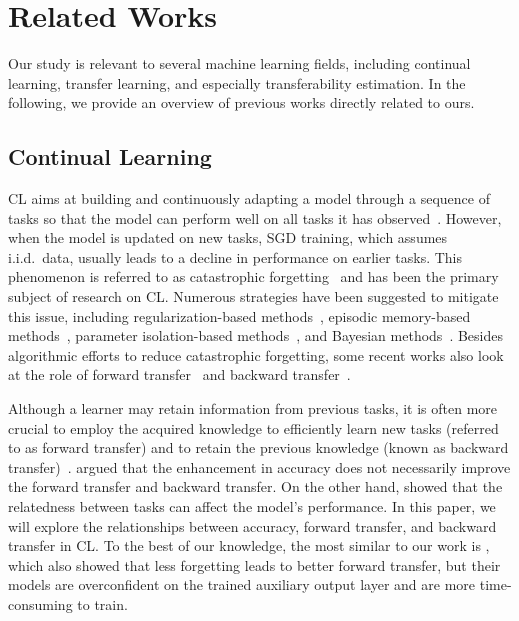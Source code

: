 \section{Related Works}
Our study is relevant to several machine learning fields, including continual learning, transfer learning, and especially transferability estimation. In the following, we provide an overview of previous works directly related to ours.


\subsection{Continual Learning}

CL aims at building and continuously adapting a model through a sequence of tasks so that the model can perform well on all tasks it has observed~\citep{ring1994continual,thrun1995lifelong}. However, when the model is updated on new tasks, SGD training, which assumes i.i.d.~data, usually leads to a decline in performance on earlier tasks. This phenomenon is referred to as catastrophic forgetting~\citep{mccloskey1989catastrophic} and has been the primary subject of research on CL. Numerous strategies have been suggested to mitigate this issue, including regularization-based methods~\citep{farajtabar2020orthogonal, yin2020optimization, bian2024make}, episodic memory-based methods~\citep{chaudhry2019tiny, buzzega2020dark, bellitto2024saliency}, parameter isolation-based methods~\citep{yoon2017lifelong, mallya2018packnet, tang2025mind}, and Bayesian methods~\citep{nguyen2024lifelong, hai2024continual}. Besides algorithmic efforts to reduce catastrophic forgetting, some recent works also look at the role of forward transfer~\citep{vinyals2016matching, snell2017prototypical} and backward transfer~\citep{lin2022beyond, wan2022continual}.

Although a learner may retain information from previous tasks, it is often more crucial to employ the acquired knowledge to efficiently learn new tasks (referred to as forward transfer) and to retain the previous knowledge (known as backward transfer)~\citep{lopez2017gradient}. \citet{raghavan2021formalizing} argued that the enhancement in accuracy does not necessarily improve the forward transfer and backward transfer. On the other hand, \cite{prado2022theory} showed that the relatedness between tasks can affect the model's performance. In this paper, we will explore the relationships between accuracy, forward transfer, and backward transfer in CL. To the best of our knowledge, the most similar to our work is \cite{chen2023forgetting}, which also showed that less forgetting leads to better forward transfer, but their models are overconfident on the trained auxiliary output layer and are more time-consuming to train.

